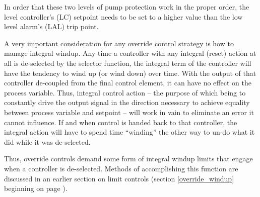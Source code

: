 In order that these two levels of pump protection work in the proper order, the level controller's (LC) setpoint needs to be set to a higher value than the low level alarm's (LAL) trip point.

\vskip 10pt

A very important consideration for any override control strategy is how to manage integral windup.  Any time a controller with any integral (reset) action at all is de-selected by the selector function, the integral term of the controller will have the tendency to wind up (or wind down) over time.  With the output of that controller de-coupled from the final control element, it can have no effect on the process variable.  Thus, integral control action -- the purpose of which being to constantly drive the output signal in the direction necessary to achieve equality between process variable and setpoint -- will work in vain to eliminate an error it cannot influence.  If and when control is handed back to that controller, the integral action will have to spend time ``winding'' the other way to un-do what it did while it was de-selected.    

Thus, override controls demand some form of integral windup limits that engage when a controller is de-selected.  Methods of accomplishing this function are discussed in an earlier section on limit controls (section \ref{override_windup} beginning on page \pageref{override_windup}).


























